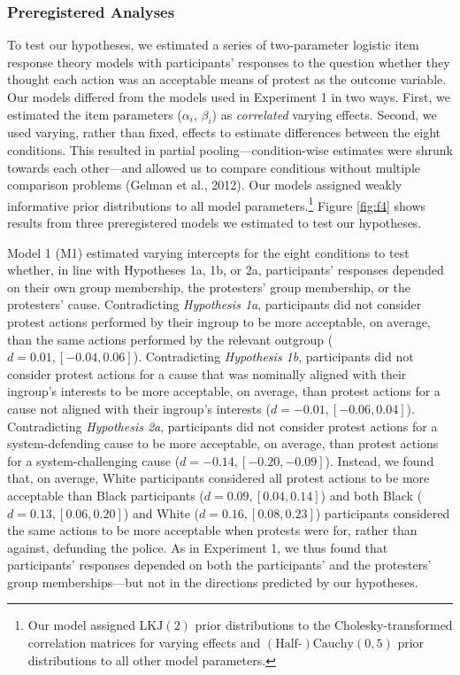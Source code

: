 \documentclass[12pt, letterpaper]{article}
\begin{document}
\hypertarget{preregistered-analyses-1}{%
\subsubsection{Preregistered Analyses}\label{preregistered-analyses-1}}

To test our hypotheses, we estimated a series of two-parameter logistic
item response theory models with participants' responses to the question
whether they thought each action was an acceptable means of protest as
the outcome variable. Our models differed from the models used in
Experiment 1 in two ways. First, we estimated the item parameters
(\(\alpha_i\), \(\beta_i\)) as \emph{correlated} varying effects.
Second, we used varying, rather than fixed, effects to estimate
differences between the eight conditions. This resulted in partial
pooling---condition-wise estimates were shrunk towards each other---and
allowed us to compare conditions without multiple comparison problems
(Gelman et al., 2012). Our models assigned weakly informative prior
distributions to all model parameters.\footnote{Our model assigned
  \(\text{LKJ} (2)\) prior distributions to the Cholesky-transformed
  correlation matrices for varying effects and
  \((\text{Half-})\text{Cauchy} (0, 5)\) prior distributions to all
  other model parameters.} Figure \ref{fig:f4} shows results from three
preregistered models we estimated to test our hypotheses.

Model 1 (M1) estimated varying intercepts for the eight conditions to
test whether, in line with Hypotheses 1a, 1b, or 2a, participants'
responses depended on their own group membership, the protesters' group
membership, or the protesters' cause. Contradicting \emph{Hypothesis
1a}, participants did not consider protest actions performed by their
ingroup to be more acceptable, on average, than the same actions
performed by the relevant outgroup (\(d = 0.01, [-0.04, 0.06]\)).
Contradicting \emph{Hypothesis 1b}, participants did not consider
protest actions for a cause that was nominally aligned with their
ingroup's interests to be more acceptable, on average, than protest
actions for a cause not aligned with their ingroup's interests
(\(d = -0.01, [-0.06, 0.04]\)). Contradicting \emph{Hypothesis 2a},
participants did not consider protest actions for a system-defending
cause to be more acceptable, on average, than protest actions for a
system-challenging cause (\(d = -0.14, [-0.20, -0.09]\)). Instead, we
found that, on average, White participants considered all protest
actions to be more acceptable than Black participants
(\(d = 0.09, [0.04, 0.14]\)) and both Black (\(d = 0.13, [0.06, 0.20]\))
and White (\(d = 0.16, [0.08, 0.23]\)) participants considered the same
actions to be more acceptable when protests were for, rather than
against, defunding the police. As in Experiment 1, we thus found that
participants' responses depended on both the participants' and the
protesters' group memberships---but not in the directions predicted by
our hypotheses.
\end{document}
